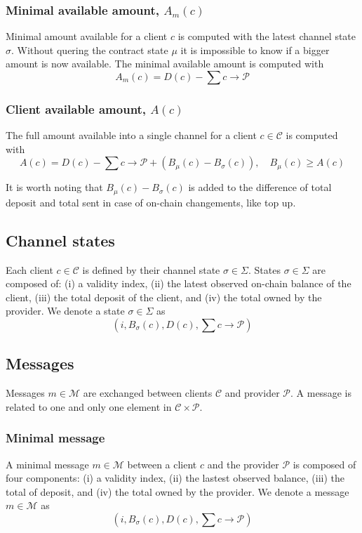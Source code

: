\documentclass{llncs}
\begin{document}
\subsubsection{Minimal available amount, $A_m(c)$} Minimal amount available for a client $c$ is computed with the latest channel state $\sigma$. Without quering the contract state $\mu$ it is impossible to know if a bigger amount is now available. The minimal available amount is computed with
$$A_m(c) = D(c) - \textstyle \sum c \rightarrow \mathcal{P}$$

\subsubsection{Client available amount, $A(c)$} The full amount available into a single channel for a client $c \in \mathcal{C}$ is computed with
$$A(c) = D(c) - \textstyle \sum c \rightarrow \mathcal{P} + (B_\mu(c) - B_\sigma(c)), \quad B_\mu(c) \geq A(c)$$

It is worth noting that $B_\mu(c) - B_\sigma(c)$ is added to the difference of total deposit and total sent in case of on-chain changements, like top up.

\subsection{Channel states} Each client $c \in \mathcal{C}$ is defined by their channel state $\sigma \in \Sigma$. States $\sigma \in \Sigma$ are composed of: (i) a validity index, (ii) the latest observed on-chain balance
of the client, (iii) the total deposit of the client, and (iv) the total owned by the provider. We denote a state $\sigma \in \Sigma$ as
$$(i, B_\sigma(c), D(c), \textstyle \sum c \rightarrow \mathcal{P})$$

\subsection{Messages} Messages $m \in \mathcal{M}$ are exchanged between clients $\mathcal{C}$ and provider $\mathcal{P}$. A message is related to one and only one element in $\mathcal{C} \times \mathcal{P}$.

\subsubsection{Minimal message} A minimal message $m \in \mathcal{M}$ between a client $c$ and the provider $\mathcal{P}$ is composed of four components: (i) a validity index, (ii) the lastest observed balance, (iii) the total of deposit, and (iv) the total owned by the provider. We denote a message $m \in \mathcal{M}$ as
$$(i, B_\sigma(c), D(c), \textstyle \sum c \rightarrow \mathcal{P})$$
\end{document}
